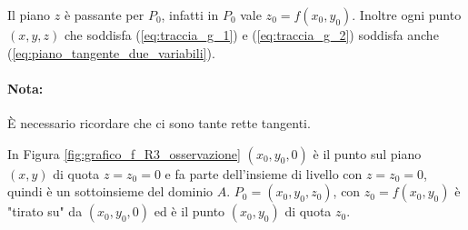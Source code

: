Il piano $z$ è passante per $P_0$, infatti in $P_0$ vale $z_0=f(x_0,y_0)$. Inoltre ogni punto $(x,y,z)$ che soddisfa (\ref{eq:traccia_g_1}) e (\ref{eq:traccia_g_2}) soddisfa anche (\ref{eq:piano_tangente_due_variabili}).
 
\paragraph{Nota:} È necessario ricordare che ci sono tante rette tangenti.

In Figura \ref{fig:grafico_f_R3_osservazione} $(x_0,y_0,0)$ è il punto sul piano $(x,y)$ di quota $z=z_0=0$ e fa parte dell'insieme di livello con $z=z_0=0$, quindi è un sottoinsieme del dominio $A$. $P_0=(x_0,y_0,z_0)$, con $z_0=f(x_0,y_0)$ è "tirato su" da $(x_0,y_0,0)$ ed è il punto $(x_0,y_0)$ di quota $z_0$.

